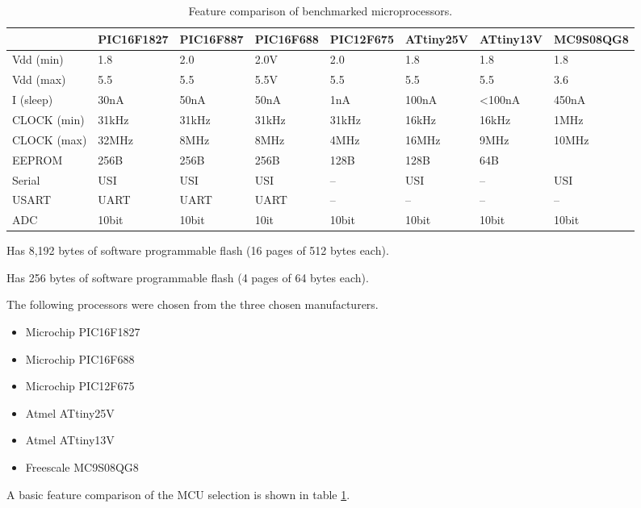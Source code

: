    \begin{table}
      \begin{centering}
        \begin{tabular}{|l|l|l|l|l|l|l|l|}
        \cline{2-8}
        \multicolumn{1}{l|}{} & PIC16F1827  & PIC16F887  & PIC16F688  & PIC12F675  & ATtiny25V  & ATtiny13V  & MC9S08QG8 \tabularnewline
        \hline
        Vdd (min)  & 1.8  & 2.0  & 2.0V  & 2.0  & 1.8  & 1.8  & 1.8 \tabularnewline
        Vdd (max)  & 5.5  & 5.5  & 5.5V  & 5.5  & 5.5  & 5.5  & 3.6 \tabularnewline
        I (sleep)  & 30nA  & 50nA  & 50nA  & 1nA  & 100nA & <100nA & 450nA\tabularnewline
        CLOCK (min)  & 31kHz  & 31kHz & 31kHz & 31kHz & 16kHz & 16kHz & 1MHz \tabularnewline
        CLOCK (max)  & 32MHz  & 8MHz  & 8MHz  & 4MHz  & 16MHz & 9MHz  & 10MHz\tabularnewline
        EEPROM  & 256B  & 256B  & 256B  & 128B  & 128B  & 64B  & \dag{}\tabularnewline
        Serial  & USI  & USI  & USI  & --  & USI  & --  & USI \tabularnewline
        USART  & UART  & UART  & UART  & --  & --  & --  & -- \tabularnewline
        ADC  & 10bit  & 10bit & 10it  & 10bit & 10bit & 10bit & 10bit\tabularnewline
        \hline
        \end{tabular}
      \end{centering}

      \begin{centering}
      \dag Has 8,192 bytes of software programmable flash (16 pages of 512 bytes each).
      \end{centering}

      \begin{centering}
      \ddag Has 256 bytes of software programmable flash (4 pages of 64 bytes each).
      \end{centering}

      \caption{\label{tab:MCUfeaturecomparison} Feature comparison of benchmarked microprocessors.}
    \end{table}

    The following processors were chosen from the three chosen manufacturers.
    \begin{itemize}
    \item Microchip PIC16F1827
    \item Microchip PIC16F688
    \item Microchip PIC12F675
    \item Atmel ATtiny25V
    \item Atmel ATtiny13V
    \item Freescale MC9S08QG8
    \end{itemize}
    A basic feature comparison of the MCU selection is shown in table \ref{tab:MCUfeaturecomparison}.





